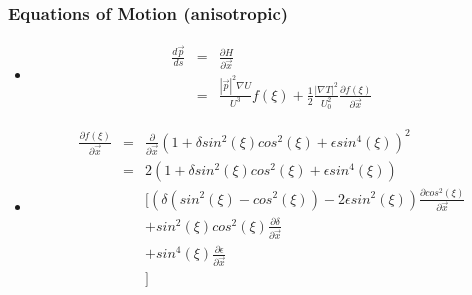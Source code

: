 \documentclass{beamer}
\begin{document}
\begin{frame}
\frametitle{Equations of Motion (anisotropic)}

\begin{itemize}

\pause \item 
\begin{eqnarray}
\frac{d\vec{p}}{ds} &=& \frac{\partial H}{\partial \vec{x}} \nonumber \\
&=& \frac{|\vec{p}|^2\nabla U}{U^3} f(\xi) + \frac{1}{2} \frac{|\nabla T|^2}{U_0^2}\frac{\partial f(\xi)}{\partial \vec{x}} \nonumber
\end{eqnarray}

\pause \item
\begin{eqnarray}
\frac{\partial f(\xi)}{\partial \vec{x}} &=& \frac{\partial}{\partial \vec{x}} (1+\delta sin^2(\xi) cos^2(\xi) + \epsilon sin^4(\xi))^2 \nonumber \\
&=& 2(1+\delta sin^2(\xi) cos^2(\xi) + \epsilon sin^4(\xi)) \nonumber \\
& & [ ( \delta ( sin^2(\xi) - cos^2(\xi) ) - 2 \epsilon sin^2(\xi)  ) \frac{\partial cos^2(\xi)}{\partial \vec{x}} \nonumber \\
& & + sin^2(\xi) cos^2(\xi) \frac{\partial \delta}{\partial \vec{x}} \nonumber \\
& & + sin^4(\xi) \frac{\partial \epsilon}{\partial \vec{x}} \nonumber \\
& & ] \nonumber 
\end{eqnarray}

\end{itemize}

\end{frame}
\end{document}
